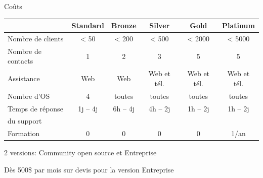 \documentclass[aspectratio=169]{beamer}
\begin{document}
\begin{frame}{Coûts}
\begin{center}

 \begin{tabular}{|l|ccccc|}
    \hline
    & Standard & Bronze & Silver & Gold & Platinum \\
    \hline
    \hline
    Nombre de clients & < 50 & < 200 & < 500 & < 2000 & < 5000 \\
    \hline
    Nombre de contacts & 1 & 2 & 3 & 5 & 5 \\
    \hline
    Assistance & Web & Web & Web et tél.& Web et tél. & Web et tél. \\
    \hline
    Nombre d'OS & 4 & toutes & toutes & toutes & toutes \\
    \hline
    Temps de réponse & 1j -- 4j & 6h -- 4j & 4h -- 2j & 1h -- 2j & 1h -- 2j \\ %
    du support &  & & & & \\
    \hline
    Formation & 0 & 0 & 0 & 0 & 1/an \\
    \hline
 \end{tabular}
\end{center}

2 versions: Community open source et Entreprise

Dès 500\$ par mois sur devis pour la version Entreprise
\end{frame}
\end{document}
